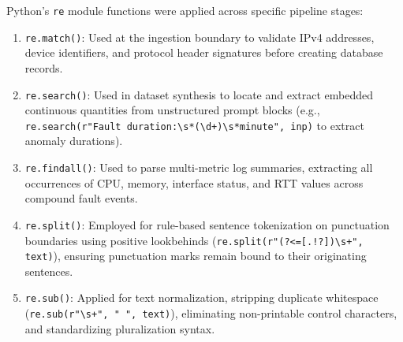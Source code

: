 \documentclass[conference]{IEEEtran}
\begin{document}
Python's \texttt{re} module functions were applied across specific pipeline stages:
\begin{enumerate}
    \item \texttt{re.match()}: Used at the ingestion boundary to validate IPv4 addresses, device identifiers, and protocol header signatures before creating database records.
    \item \texttt{re.search()}: Used in dataset synthesis to locate and extract embedded continuous quantities from unstructured prompt blocks (e.g., \texttt{re.search(r"Fault duration:\textbackslash s*(\textbackslash d+)\textbackslash s*minute", inp)} to extract anomaly durations).
    \item \texttt{re.findall()}: Used to parse multi-metric log summaries, extracting all occurrences of CPU, memory, interface status, and RTT values across compound fault events.
    \item \texttt{re.split()}: Employed for rule-based sentence tokenization on punctuation boundaries using positive lookbehinds (\texttt{re.split(r"(?<=[.!?])\textbackslash s+", text)}), ensuring punctuation marks remain bound to their originating sentences.
    \item \texttt{re.sub()}: Applied for text normalization, stripping duplicate whitespace (\texttt{re.sub(r"\textbackslash s+", " ", text)}), eliminating non-printable control characters, and standardizing pluralization syntax.
\end{enumerate}
\end{document}
